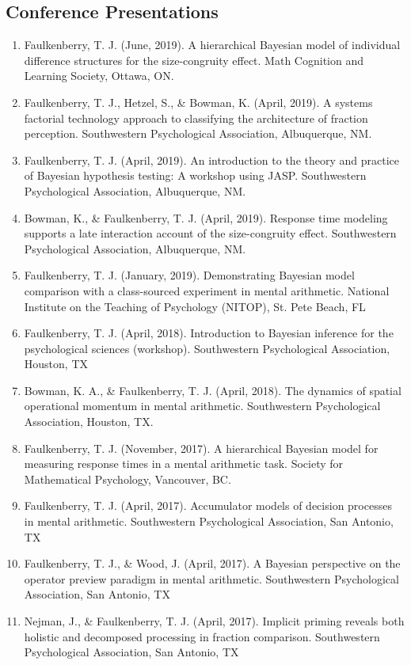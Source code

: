 \documentclass[article,10pt]{article}
\begin{document}
\subsection*{Conference Presentations}
\label{sec:org634c0c0}
\begin{enumerate}
\item Faulkenberry, T. J. (June, 2019). A hierarchical Bayesian model of individual difference structures for the size-congruity effect. Math Cognition and Learning Society, Ottawa, ON.
\item Faulkenberry, T. J., Hetzel, S., \& Bowman, K. (April, 2019). A systems factorial technology approach to classifying the architecture of fraction perception. Southwestern Psychological Association, Albuquerque, NM.
\item Faulkenberry, T. J. (April, 2019). An introduction to the theory and practice of Bayesian hypothesis testing: A workshop using JASP. Southwestern Psychological Association, Albuquerque, NM.
\item Bowman, K., \& Faulkenberry, T. J. (April, 2019). Response time modeling supports a late interaction account of the size-congruity effect. Southwestern Psychological Association, Albuquerque, NM.
\item Faulkenberry, T. J. (January, 2019). Demonstrating Bayesian model comparison with a class-sourced experiment in mental arithmetic. National Institute on the Teaching of Psychology (NITOP), St. Pete Beach, FL
\item Faulkenberry, T. J. (April, 2018). Introduction to Bayesian inference for the psychological sciences (workshop). Southwestern Psychological Association, Houston, TX
\item Bowman, K. A., \& Faulkenberry, T. J. (April, 2018). The dynamics of spatial operational momentum in mental arithmetic. Southwestern Psychological Association, Houston, TX.
\item Faulkenberry, T. J. (November, 2017). A hierarchical Bayesian model for measuring response times in a mental arithmetic task. Society for Mathematical Psychology, Vancouver, BC.
\item Faulkenberry, T. J. (April, 2017). Accumulator models of decision processes in mental arithmetic. Southwestern Psychological Association, San Antonio, TX
\item Faulkenberry, T. J., \& Wood, J. (April, 2017). A Bayesian perspective on the operator preview paradigm in mental arithmetic. Southwestern Psychological Association, San Antonio, TX
\item Nejman, J., \& Faulkenberry, T. J. (April, 2017). Implicit priming reveals both holistic and decomposed processing in fraction comparison. Southwestern Psychological Association, San Antonio, TX

\end{enumerate}
\end{document}

